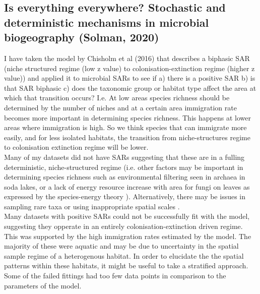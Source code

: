 \subsection{Is everything everywhere? Stochastic and deterministic mechanisms in microbial biogeography (Solman, 2020)}
    
\noindent I have taken the model by Chisholm et al (2016) that describes a biphasic SAR (niche structured regime (low z value) to colonisation-extinction regime (higher z value)) and applied it to microbial SARs to see if a) there is a positive SAR b) is that SAR biphasic c) does the taxonomic group or habitat type affect the area at which that transition occurs? I.e. At low areas species richness should be determined by the number of niches and at a certain area immigration rate becomes more important in determining species richness. This happens at lower areas where immigration is high. So we think species that can immigrate more easily, and for less isolated habitats, the transition from niche-structures regime to colonisation extinction regime will be lower.\\

\noindent Many of my datasets did not have SARs suggesting that these are in a fulling deterministic, niche-structured regime (i.e. other factors may be important in determining species richness such as environmental filtering seen in archaea in soda lakes, or a lack of energy resource increase with area for fungi on leaves as expressed by the species-energy theory \cite{FeinsteinLarryM2012Tran}). Alternatively, there may be issues in sampling rare taxa \cite{woodcock2006taxa} or using inappropriate spatial scales \cite{davison2018microbial}.\\


\noindent Many datasets with positive SARs could not be successfully fit with the model, suggesting they opperate in an entirely colonisation-extinction driven regime. This was supported by the high immigration rates estimated by the model. The majority of these were aquatic and may be due to uncertainty in the spatial sample regime of a heterogenous habitat. In order to elucidate the the spatial patterns within these habitats, it might be useful to take a stratified approach. Some of the failed fittings had too few data points in comparison to the parameters of the model.\\

